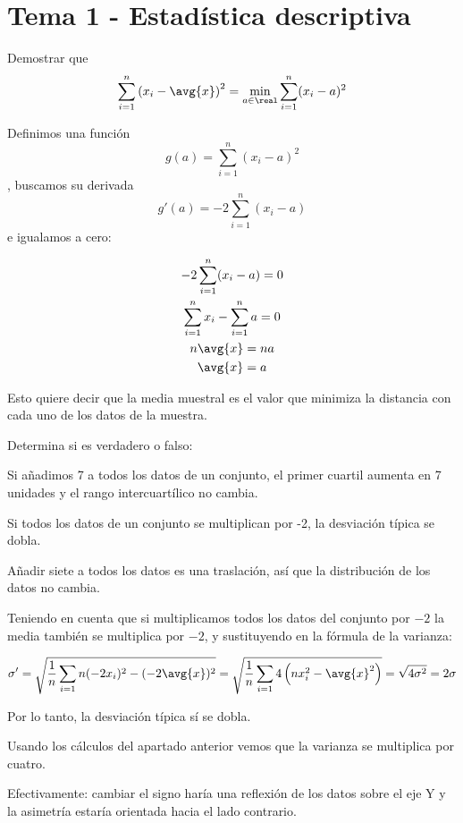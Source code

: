 \section{Tema 1 - Estadística descriptiva}

\begin{problem}[2] Demostrar que \[ \sum_{i=1}^n \left(x_i-\avg{x}\right)^2 = \min_{a\in \real} \sum_{i=1}^n(x_i-a)^2 \]

\solution

Definimos una función \[ g(a) = \sum_{i=1}^n(x_i-a)^2 \], buscamos su derivada \[ g'(a) = -2 \sum_{i=1}^n(x_i-a) \] e igualamos a cero:

\begin{gather*}
-2 \sum_{i=1}^n(x_i-a) = 0 \\
\sum_{i=1}^n x_i - \sum_{i=1}^n a = 0 \\
n \avg{x} = n a \\
\avg{x} = a 
\end{gather*}

Esto quiere decir que la media muestral es el valor que minimiza la distancia con cada uno de los datos de la muestra.
\end{problem}

\begin{problem}[5]Determina si es verdadero o falso:

\ppart Si añadimos 7 a todos los datos de un conjunto, el primer cuartil aumenta en 7 unidades y el rango intercuartílico no cambia.

\ppart Si todos los datos de un conjunto se multiplican por -2, la desviación típica se dobla.
\solution 

\spart Añadir siete a todos los datos es una traslación, así que la distribución de los datos no cambia.

\spart Teniendo en cuenta que si multiplicamos todos los datos del conjunto por $-2$ la media también se multiplica por $-2$, y sustituyendo en la fórmula de la varianza:

\[ \sigma' = \sqrt{\frac{1}{n} \sum_{i=1}n (-2x_i)^2 - (-2\avg{x})^2} = \sqrt{\frac{1}{n} \sum_{i=1}4\left(n x_i^2 - \avg{x}^2\right)} = \sqrt{4\sigma^2} = 2\sigma \]

Por lo tanto, la desviación típica sí se dobla.

\spart Usando los cálculos del apartado anterior vemos que la varianza se multiplica por cuatro.

\spart Efectivamente: cambiar el signo haría una reflexión de los datos sobre el eje Y y la asimetría estaría orientada hacia el lado contrario. 

\end{problem}

